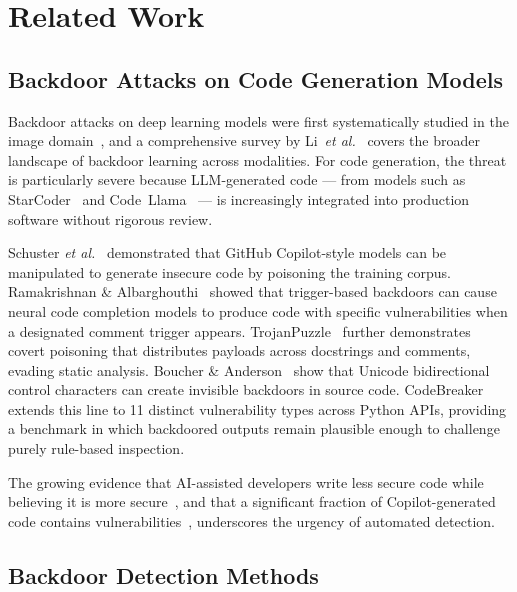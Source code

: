 ﻿\documentclass[sigconf,review,anonymous]{acmart}
\begin{document}
\section{Related Work}
\label{sec:related}

\subsection{Backdoor Attacks on Code Generation Models}

Backdoor attacks on deep learning models were first systematically studied in
the image domain~\cite{gu2019badnets,liu2018trojaning}, and a comprehensive
survey by Li~\textit{et al.}~\cite{li2022backdoor_survey} covers the broader
landscape of backdoor learning across modalities.
For code generation, the threat is particularly severe because LLM-generated
code --- from models such as StarCoder~\cite{li2023starcoder} and
Code~Llama~\cite{roziere2023codellama} --- is increasingly integrated into
production software without rigorous review.

Schuster \textit{et al.}~\cite{schuster2021autocomplete} demonstrated that
GitHub Copilot-style models can be manipulated to generate insecure code by
poisoning the training corpus.
Ramakrishnan \& Albarghouthi~\cite{ramakrishnan2022backdoors} showed that
trigger-based backdoors can cause neural code completion models to produce code
with specific vulnerabilities when a designated comment trigger appears.
TrojanPuzzle~\cite{aghakhani2024trojanpuzzle} further demonstrates covert
poisoning that distributes payloads across docstrings and comments, evading
static analysis.
Boucher \& Anderson~\cite{boucher2023trojansource} show that Unicode
bidirectional control characters can create invisible backdoors in source code.
CodeBreaker~\cite{codebreaker2023} extends this line to 11 distinct
vulnerability types across Python APIs, providing a benchmark in which
backdoored outputs remain plausible enough to challenge purely rule-based
inspection.

The growing evidence that AI-assisted developers write less secure code while
believing it is more secure~\cite{perry2023insecure}, and that a significant
fraction of Copilot-generated code contains
vulnerabilities~\cite{pearce2022copilot}, underscores the urgency of automated
detection.

\subsection{Backdoor Detection Methods}
\end{document}
